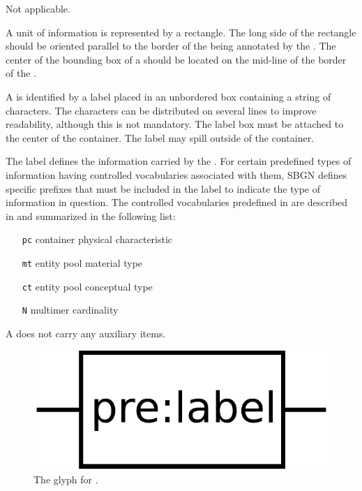 \begin{glyphDescription}

\glyphSboTerm Not applicable.

\glyphContainer A unit of information is represented by a rectangle.  The long side of the rectangle should be oriented parallel to the border of the  being annotated by the . The center of the bounding box of a  should be located on the mid-line of the border of the .

\glyphLabel A  is identified by a label placed in an unbordered box containing a string of characters.  The characters can be distributed on several lines to improve readability, although this is not mandatory.  The label box must be attached to the center of the container.  The label may spill outside of the container.

The label defines the information carried by the .  For certain predefined types of information having controlled vocabularies associated with them, SBGN defines specific prefixes that must be included in the label to indicate the type of information in question.  The controlled vocabularies predefined in \SBGNPDLone are described in  and summarized in the following list:

\begin{center}
  \begin{itemize}\setlength{\parskip}{0ex}
  \item[\texttt{pc}] container physical characteristic
  \item[\texttt{mt}] entity pool material type
  \item[\texttt{ct}] entity pool conceptual type
  \item[\texttt{N}]  multimer cardinality
  \end{itemize}
\end{center}

\glyphAux A  does not carry any auxiliary items.  

\end{glyphDescription}

\begin{figure}[H]
  \centering
  \includegraphics[scale = 0.3]{images/unitInformation}
  \caption{The \PD glyph for .}
  \label{fig:unitInfo}
\end{figure}


